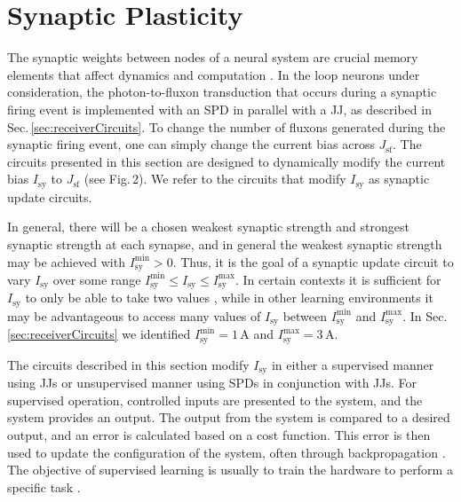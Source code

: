 \documentclass[aip,amsmath,amssymb,reprint,nofootinbib]{revtex4-1}
\begin{document}
\section{\label{sec:synapticPlasticity}Synaptic Plasticity}
The synaptic weights between nodes of a neural system are crucial memory elements that affect dynamics and computation \cite{abre2004,bu2006,siqu2007,haah2015}. In the loop neurons under consideration, the photon-to-fluxon transduction that occurs during a synaptic firing event is implemented with an SPD in parallel with a JJ, as described in Sec.\,\ref{sec:receiverCircuits}. To change the number of fluxons generated during the synaptic firing event, one can simply change the current bias across $J_{\mathrm{sf}}$. The circuits presented in this section are designed to dynamically modify the current bias $I_{\mathrm{sy}}$ to $J_{\mathrm{sf}}$ (see Fig.\,2). We refer to the circuits that modify $I_{\mathrm{sy}}$ as synaptic update circuits.

In general, there will be a chosen weakest synaptic strength and strongest synaptic strength at each synapse, and in general the weakest synaptic strength may be achieved with $I_{\mathrm{sy}}^{\mathrm{min}} > 0$. Thus, it is the goal of a synaptic update circuit to vary $I_{\mathrm{sy}}$ over some range $I_{\mathrm{sy}}^{\mathrm{min}}\le I_{\mathrm{sy}} \le I_{\mathrm{sy}}^{\mathrm{max}}$. In certain contexts it is sufficient for $I_{\mathrm{sy}}$ to only be able to take two values  \cite{lide2015}, while in other learning environments it may be advantageous to access many values of $I_{\mathrm{sy}}$ between $I_{\mathrm{sy}}^{\mathrm{min}}$ and $I_{\mathrm{sy}}^{\mathrm{max}}$. In Sec.\,\ref{sec:receiverCircuits} we identified $I_{\mathrm{sy}}^{\mathrm{min}} = 1$\,\textmu A and $I_{\mathrm{sy}}^{\mathrm{max}} = 3$\,\textmu A. 

The circuits described in this section modify $I_{\mathrm{sy}}$ in either a supervised manner using JJs or unsupervised manner using SPDs in conjunction with JJs. For supervised operation, controlled inputs are presented to the system, and the system provides an output. The output from the system is compared to a desired output, and an error is calculated based on a cost function. This error is then used to update the configuration of the system, often through backpropagation \cite{ni2015}. The objective of supervised learning is usually to train the hardware to perform a specific task \cite{sihu2016}. 
\end{document}
